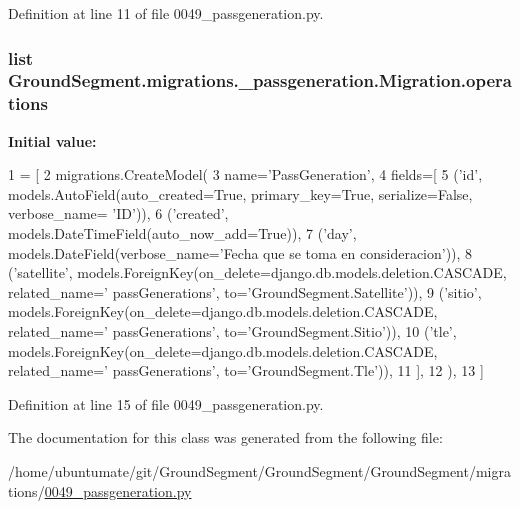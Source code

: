 Definition at line 11 of file 0049\+\_\+passgeneration.\+py.

\hypertarget{class_ground_segment_1_1migrations_1_10049__passgeneration_1_1_migration_a6c8adae701c04c70c5738eca3462cce1}{}
\subsubsection[{operations}]{\setlength{\rightskip}{0pt plus 5cm}list Ground\+Segment.\+migrations.\+\_\+passgeneration.\+Migration.\+operations\hspace{0.3cm}{\ttfamily [static]}}\label{class_ground_segment_1_1migrations_1_10049__passgeneration_1_1_migration_a6c8adae701c04c70c5738eca3462cce1}
{\bfseries Initial value\+:}
\begin{DoxyCode}
1 = [
2         migrations.CreateModel(
3             name=\textcolor{stringliteral}{'PassGeneration'},
4             fields=[
5                 (\textcolor{stringliteral}{'id'}, models.AutoField(auto\_created=\textcolor{keyword}{True}, primary\_key=\textcolor{keyword}{True}, serialize=\textcolor{keyword}{False}, verbose\_name=\textcolor{stringliteral}{
      'ID'})),
6                 (\textcolor{stringliteral}{'created'}, models.DateTimeField(auto\_now\_add=\textcolor{keyword}{True})),
7                 (\textcolor{stringliteral}{'day'}, models.DateField(verbose\_name=\textcolor{stringliteral}{'Fecha que se toma en consideracion'})),
8                 (\textcolor{stringliteral}{'satellite'}, models.ForeignKey(on\_delete=django.db.models.deletion.CASCADE, related\_name=\textcolor{stringliteral}{'
      passGenerations'}, to=\textcolor{stringliteral}{'GroundSegment.Satellite'})),
9                 (\textcolor{stringliteral}{'sitio'}, models.ForeignKey(on\_delete=django.db.models.deletion.CASCADE, related\_name=\textcolor{stringliteral}{'
      passGenerations'}, to=\textcolor{stringliteral}{'GroundSegment.Sitio'})),
10                 (\textcolor{stringliteral}{'tle'}, models.ForeignKey(on\_delete=django.db.models.deletion.CASCADE, related\_name=\textcolor{stringliteral}{'
      passGenerations'}, to=\textcolor{stringliteral}{'GroundSegment.Tle'})),
11             ],
12         ),
13     ]
\end{DoxyCode}


Definition at line 15 of file 0049\+\_\+passgeneration.\+py.



The documentation for this class was generated from the following file\+:\begin{DoxyCompactItemize}
\item 
/home/ubuntumate/git/\+Ground\+Segment/\+Ground\+Segment/\+Ground\+Segment/migrations/\hyperlink{0049__passgeneration_8py}{0049\+\_\+passgeneration.\+py}\end{DoxyCompactItemize}
